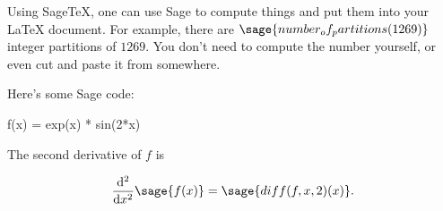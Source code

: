 \documentclass{article}
\begin{document}
	
	Using Sage\TeX, one can use Sage to compute things and put them into
	your \LaTeX{} document. For example, there are
	$\sage{number_of_partitions(1269)}$ integer partitions of $1269$.
	You don't need to compute the number yourself, or even cut and paste
	it from somewhere.
	
	Here's some Sage code:
	
	\begin{sageblock}
		f(x) = exp(x) * sin(2*x)
	\end{sageblock}
	
	The second derivative of $f$ is
	
	\[
	\frac{\mathrm{d}^{2}}{\mathrm{d}x^{2}} \sage{f(x)} =
	\sage{diff(f, x, 2)(x)}.
	\]

	
\end{document}

